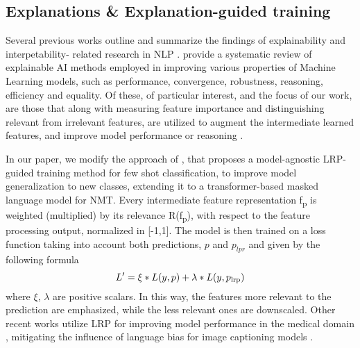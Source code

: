 \documentclass[11pt]{article}
\begin{document}
\subsection*{Explanations \& Explanation-guided training}

Several previous works outline and summarize the findings of explainability and interpetability- related research in NLP \citep{belinkov-etal-2020-interpretability,sun2021interpreting,tenney2020language,madsen2021post,danilevsky2020survey,qian2021xnlp}.
\citet{weber2022beyond} provide a systematic review of explainable AI methods employed in improving various properties of Machine Learning models, such as performance, convergence, robustness, reasoning, efficiency and equality. Of these, of particular interest, and the focus of our work, are those that along with measuring feature importance and distinguishing relevant from irrelevant features, are utilized to augment the intermediate learned features, and improve model performance or reasoning \citep{anders2022finding,sun2021explanation,zunino2021excitation,fukui2019attention,zhou2016learning,mitsuhara2019embedding,schiller2019relevance,zunino2021explainable}. 

In our paper, we modify the approach of
\citet{sun2021explanation}, that proposes a model-agnostic LRP-guided training method for few shot classification, to improve model generalization to new classes, extending it to a transformer-based masked language model for NMT. Every intermediate feature representation f\textsubscript{p} is weighted (multiplied) by its relevance R(f\textsubscript{p}), with respect to the feature processing output, normalized in [-1,1]. The model is then trained on a loss function taking into account both predictions, $p$ and $p_{lpr}$ and given by the following formula
\begin{equation}
{L' = \xi * L (y,p) + \lambda * L (y, p\textsubscript{lrp})}\end{equation}where ${\xi}$, ${\lambda}$
are positive scalars. In this way, the features more relevant to the prediction are emphasized, while the less relevant ones are downscaled.
Other recent works utilize LRP for improving model performance in the medical domain
\citep{sefcik2021improving}, mitigating the influence of language
bias for image captioning models \citep{sun2022explain}.
\end{document}
